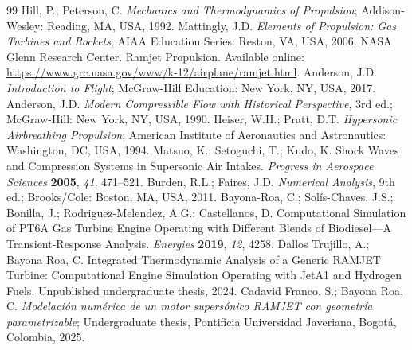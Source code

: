 \documentclass[preprint,12pt]{elsarticle}
\begin{document}
\begin{thebibliography}{99}
Hill, P.; Peterson, C. \textit{Mechanics and Thermodynamics of Propulsion}; Addison-Wesley: Reading, MA, USA, 1992.
Mattingly, J.D. \textit{Elements of Propulsion: Gas Turbines and Rockets}; AIAA Education Series: Reston, VA, USA, 2006.
NASA Glenn Research Center. Ramjet Propulsion. Available online: \url{https://www.grc.nasa.gov/www/k-12/airplane/ramjet.html}.
Anderson, J.D. \textit{Introduction to Flight}; McGraw-Hill Education: New York, NY, USA, 2017.
Anderson, J.D. \textit{Modern Compressible Flow with Historical Perspective}, 3rd ed.; McGraw-Hill: New York, NY, USA, 1990.
Heiser, W.H.; Pratt, D.T. \textit{Hypersonic Airbreathing Propulsion}; American Institute of Aeronautics and Astronautics: Washington, DC, USA, 1994.
Matsuo, K.; Setoguchi, T.; Kudo, K. Shock Waves and Compression Systems in Supersonic Air Intakes. \textit{Progress in Aerospace Sciences} \textbf{2005}, \textit{41}, 471--521.
Burden, R.L.; Faires, J.D. \textit{Numerical Analysis}, 9th ed.; Brooks/Cole: Boston, MA, USA, 2011.
Bayona-Roa, C.; Solís-Chaves, J.S.; Bonilla, J.; Rodriguez-Melendez, A.G.; Castellanos, D. Computational Simulation of PT6A Gas Turbine Engine Operating with Different Blends of Biodiesel---A Transient-Response Analysis. \textit{Energies} \textbf{2019}, \textit{12}, 4258.
Dallos Trujillo, A.; Bayona Roa, C. Integrated Thermodynamic Analysis of a Generic RAMJET Turbine: Computational Engine Simulation Operating with JetA1 and Hydrogen Fuels. Unpublished undergraduate thesis, 2024.
Cadavid Franco, S.; Bayona Roa, C. \textit{Modelación numérica de un motor supersónico RAMJET con geometría parametrizable}; Undergraduate thesis, Pontificia Universidad Javeriana, Bogotá, Colombia, 2025.
\end{thebibliography}
\end{document}
